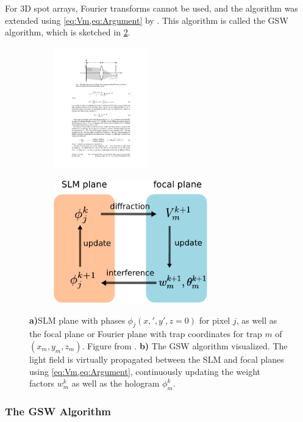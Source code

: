 For 3D spot arrays, Fourier transforms cannot be used, and the algorithm was extended using \cref{eq:Vm,eq:Argument} by \cite{DiLeonardo2007}. 
This algorithm is called the \ac{GSW} algorithm, which is sketched in \cref{fig:GSWalgorithm}.

\begin{figure}
	\centering
	\begin{subfigure}{.56\textwidth}
		\centering
		\includegraphics[height=5.3cm]{figures/SLMgeometry.pdf}
		\caption{}
		\label{fig:SLMgeometry}
	\end{subfigure}
	\begin{subfigure}{.43\textwidth}
		\centering
		\includegraphics[height=5.3cm]{figures/WeightedGerschbergSaxton.pdf}
		\caption{}
		\label{fig:GSWalgorithm}
	\end{subfigure}
	\caption{\textsf{\textbf{a)}}SLM plane with phases $\phi_j(x,',y',z=0)$ for pixel $j$, as well as the focal plane or Fourier plane with trap coordinates for trap $m$ of $(x_m,y_m,z_m)$. 
		Figure from \cite{DiLeonardo2007}. 
		\textsf{\textbf{b)}} The \ac{GSW} algorithm visualized.
		The light field is virtually propagated between the SLM and focal planes using \cref{eq:Vm,eq:Argument}, continuously updating the weight factors $w_m^k$ as well as the hologram $\phi_m^k$.}
	\label{fig:GerschbergSaxton}
\end{figure}

\subsubsection*{The GSW Algorithm}

